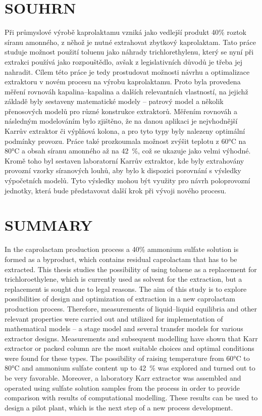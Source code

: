 \documentclass[a4paper, 12pt]{article}
\begin{document}

\section*{SOUHRN}
Při průmyslové výrobě kaprolaktamu vzniká jako vedlejší produkt 40\% roztok síranu amonného, z něhož je nutné extrahovat zbytkový kaprolaktam.
Tato práce studuje možnost použití toluenu jako náhrady trichlorethylenu, který se nyní při extrakci používá jako rozpouštědlo, avšak z legislativních důvodů je třeba jej nahradit.
Cílem této práce je tedy prostudovat možnosti návrhu a optimalizace extraktoru v novém procesu na výrobu kaprolaktamu.
Proto byla provedena měření rovnováh kapalina--kapalina a dalších relevantních vlastností, na jejichž základě byly sestaveny matematické modely -- patrový model a několik přenosových modelů pro různé konstrukce extraktorů.
Měřením rovnováh a následným modelováním bylo zjištěno, že na danou aplikaci je nejvhodnější Karrův extraktor či výplňová kolona, a pro tyto typy byly nalezeny optimální podmínky provozu.
Práce také prozkoumala možnost zvýšit teplotu z 60°C na 80°C a obsah síranu amonného až na 42~\%, což se ukazuje jako velmi výhodné.
Kromě toho byl sestaven laboratorní Karrův extraktor, kde byly extrahovány provozní vzorky síranových louhů, aby bylo k dispozici porovnání s výsledky výpočetních modelů.
Tyto výsledky mohou být využity pro návrh poloprovozní jednotky, která bude představovat další krok při vývoji nového procesu.

\section*{SUMMARY}
In the caprolactam production process a 40\% ammonium sulfate solution is formed as a byproduct, which contains residual caprolactam that has to be extracted.
This thesis studies the possibility of using toluene as a replacement for trichloroethylene, which is currently used as solvent for the extraction, but a replacement is sought due to legal reasons.
The aim of this study is to explore possibilities of design and optimization of extraction in a new caprolactam production process.
Therefore, measurements of liquid--liquid equilibria and other relevant properties were carried out and utilized for implementation of mathematical models -- a stage model and several transfer models for various extractor designs.
Measurements and subsequent modelling have shown that Karr extractor or packed column are the most suitable choices and optimal conditions were found for these types.
The possibility of raising temperature from 60°C to 80°C and ammonium sulfate content up to 42~\% was explored and turned out to be very favorable.
Moreover, a laboratory Karr extractor was assembled and operated using sulfate solution samples from the process in order to provide comparison with results of computational modelling.
These results can be used to design a pilot plant, which is the next step of a new process development.
\end{document}
